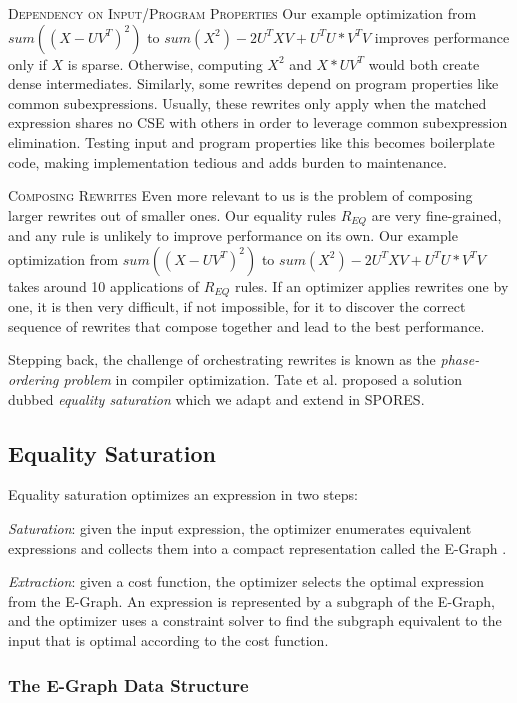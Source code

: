 \textsc{Dependency on Input/Program Properties} Our example optimization from 
$sum((X-UV^T)^2)$  to $sum(X^2) -2U^TXV + U^TU*V^TV$
improves performance only if $X$ is sparse. Otherwise,
computing $X^2$ and $X*UV^T$ would both create dense intermediates. Similarly,
some rewrites depend on program properties like common subexpressions. Usually,
these rewrites only apply when the matched expression shares no CSE with others
in order to leverage common subexpression elimination. Testing input and program
properties like this becomes boilerplate code, making implementation tedious and
adds burden to maintenance.

\textsc{Composing Rewrites} Even more relevant to us is the problem of composing
larger rewrites out of smaller ones. Our equality rules $R_{EQ}$ are very
fine-grained, and any rule is unlikely to improve performance on its own. 
Our example optimization from $sum((X-UV^T)^2)$ to $sum(X^2) - 2U^TXV + U^TU * V^TV$ 
takes around 10 applications of $R_{EQ}$ rules. 
 If an optimizer applies rewrites one by one, it is
then very difficult, if not impossible, for it to discover the correct sequence
of rewrites that compose together and lead to the best performance.

Stepping back, the challenge of orchestrating rewrites is known as the
\emph{phase-ordering problem} in compiler optimization. Tate
et al. \cite{DBLP:journals/corr/abs-1012-1802} proposed a solution  dubbed
\textit{equality saturation} which we adapt and extend in SPORES.

\subsection{Equality Saturation}

Equality saturation optimizes an expression in two steps:

\textit{Saturation}: given the input expression, the optimizer  enumerates
equivalent expressions and collects them into a compact representation called
the E-Graph \cite{10.5555/909447}.

\textit{Extraction}: given a cost function, the optimizer selects the optimal
expression from the E-Graph. An expression is represented by a subgraph of the
E-Graph, and the optimizer uses a constraint solver to find the subgraph
equivalent to the input that is optimal according to the cost function.

\subsubsection*{The E-Graph Data Structure}

